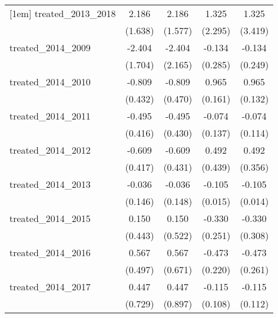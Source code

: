 {\begin{tabular}{l*{4}{c}}
[1em]
treated\_2013\_2018&       2.186         &       2.186         &       1.325         &       1.325         \\
            &     (1.638)         &     (1.577)         &     (2.295)         &     (3.419)         \\
[1em]
treated\_2014\_2009&      -2.404         &      -2.404         &      -0.134         &      -0.134         \\
            &     (1.704)         &     (2.165)         &     (0.285)         &     (0.249)         \\
[1em]
treated\_2014\_2010&      -0.809         &      -0.809         &       0.965\sym{***}&       0.965\sym{***}\\
            &     (0.432)         &     (0.470)         &     (0.161)         &     (0.132)         \\
[1em]
treated\_2014\_2011&      -0.495         &      -0.495         &      -0.074         &      -0.074         \\
            &     (0.416)         &     (0.430)         &     (0.137)         &     (0.114)         \\
[1em]
treated\_2014\_2012&      -0.609         &      -0.609         &       0.492         &       0.492         \\
            &     (0.417)         &     (0.431)         &     (0.439)         &     (0.356)         \\
[1em]
treated\_2014\_2013&      -0.036         &      -0.036         &      -0.105\sym{***}&      -0.105\sym{***}\\
            &     (0.146)         &     (0.148)         &     (0.015)         &     (0.014)         \\
[1em]
treated\_2014\_2015&       0.150         &       0.150         &      -0.330         &      -0.330         \\
            &     (0.443)         &     (0.522)         &     (0.251)         &     (0.308)         \\
[1em]
treated\_2014\_2016&       0.567         &       0.567         &      -0.473\sym{*}  &      -0.473         \\
            &     (0.497)         &     (0.671)         &     (0.220)         &     (0.261)         \\
[1em]
treated\_2014\_2017&       0.447         &       0.447         &      -0.115         &      -0.115         \\
            &     (0.729)         &     (0.897)         &     (0.108)         &     (0.112)         \\

\end{tabular}}
